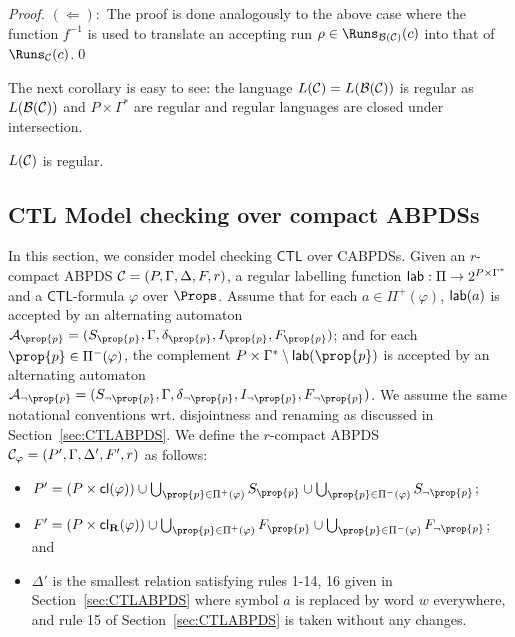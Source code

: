 \documentclass{llncs}
\renewcommand{\CTL}{\ensuremath{\mathsf{CTL}}\xspace}
\let\phi\varphi
\begin{document}
{{\begin{proof}
\noindent$(\Leftarrow):$ The proof is done analogously to the above case where the function $f^{-1}$ is used to translate
an accepting run $\rho \in \Runs_{\ABPDS(\CABPDS)}(c)$ into that of $\Runs_\CABPDS(c)$.\qed
\end{proof}}
The next corollary is easy to see: the language $L(\mathcal{C})=L(\mathcal{B}(\mathcal{C}))$ is regular as  $L(\mathcal{B}(\mathcal{C}))$ and $P \times \Gamma^*$ are regular and regular languages are closed under intersection.
\begin{corollary}
$L(\mathcal{C})$ is regular. 
\end{corollary}
\vspace{-0.4cm}



\subsection{CTL Model checking over compact ABPDSs}

In this section, we consider  model checking \CTL over CABPDSs. Given an $r$-compact ABPDS $\mathcal{C}=(P,\Gamma,\Delta,F,r)$, a regular labelling function 
$\mathsf{lab} : \Pi \to 2^{P\times\Gamma^*}$ and a \CTL-formula $\varphi$ over $\Props$.
Assume that for each $a \in \Pi^+(\phi)$, $\mathsf{lab}(a)$ is accepted by an alternating automaton
$\AAut_\prop{p} = (S_\prop{p},\Gamma,\delta_\prop{p}, I_\prop{p},F_\prop{p})$; and for each $\prop{p} \in \Pi^-(\phi)$, 
the complement $P \times \Gamma^* \setminus \lab(\prop{p})$ is accepted by an alternating automaton
$\AAut_{\neg \prop{p}} = (S_{\neg \prop{p}},\Gamma,\delta_{\neg \prop{p}}, I_{\neg \prop{p}},F_{\neg \prop{p}})$. We assume the same notational conventions wrt. disjointness and renaming as discussed in Section~\ref{sec:CTLABPDS}. We define the $r$-compact ABPDS $\CABPDS_{\phi}=(P',\Gamma,\Delta',F',r)$ as follows:
\begin{itemize}
\item $P' = (P \times \cl(\phi)) \cup 
            \bigcup_{\prop{p} \in \Pi^+(\phi)} S_{\prop{p}} \cup 
			\bigcup_{{\prop{p}} \in \Pi^-(\phi)} S_{\neg \prop{p}}$;
\item $F' = (P \times \cl_\Release(\phi)) \cup \bigcup_{\prop{p} \in \Pi^+(\phi)} F_{ \prop{p}} \cup 
			\bigcup_{{\prop{p}} \in \Pi^-(\phi)} F_{\neg \prop{p}}$; and
\item $\Delta'$ is the smallest relation satisfying rules 1-14, 16  given in Section~\ref{sec:CTLABPDS} where symbol $a$ is replaced by word $w$ everywhere, and rule 15 of Section~\ref{sec:CTLABPDS} is taken without any changes.
\end{itemize}


}
\end{document}
